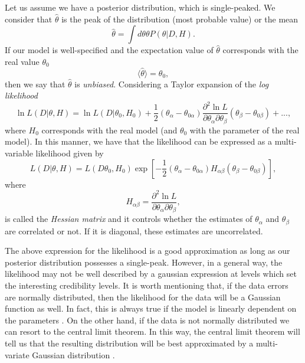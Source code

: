 \documentclass[onecolumn,           %
               showpacs,            %
               preprintnumbers,     %
               aps,                 %
               letterpaper,             %
               superscriptaddress,      %
               nofootinbib,         %
               tightenlines,        %
               floats,floatfix      %
               ,usenatbib,
               ]{revtex4-1}
\begin{document}
Let us assume we have a posterior distribution, which is single-peaked. We consider that $\hat \theta$ is the peak of the distribution (most probable value) or the mean
\begin{equation}
\hat \theta =\int d\theta \theta P(\theta|D, H).
\end{equation}
If our model is well-specified and the expectation value of $\hat \theta$ corresponds with the real value $\theta_0$
\begin{equation}
\langle\hat \theta\rangle=\theta_0,
\end{equation}
then we say that $\hat \theta$ is \textit{unbiased}. Considering a Taylor expansion of the \textit{log likelihood}
\begin{equation}
\ln L(D|\theta, H)=\ln L(D|\theta_0, H_0)+\frac{1}{2}(\theta_\alpha-\theta_{0\alpha})\frac{\partial^2\ln L}{\partial\theta_\alpha \partial\theta_\beta}(\theta_\beta-\theta_{0\beta})+...,
\end{equation}
where $H_0$ corresponds with the real model (and $\theta_0$ with the parameter of the real model). In this manner, we have that the likelihood can be expressed as a multi-variable likelihood given by 
\begin{equation}\label{GLik}
L(D|\theta, H)=L(D\theta_0, H_0)\exp \left[-\frac{1}{2}(\theta_\alpha-\theta_{0\alpha})H_{\alpha\beta}(\theta_\beta-\theta_{0\beta})\right],
\end{equation}
where 
\begin{equation}
H_{\alpha\beta}=\frac{\partial^2\ln L}{\partial\theta_\alpha \partial\theta_\beta},
\end{equation}
is called the \textit{Hessian matrix} and it controls whether the estimates of $\theta_\alpha$ and $\theta_\beta$ are correlated or not. If it is diagonal, these estimates are uncorrelated.

The above expression for the likelihood is a good approximation as long as our posterior distribution possesses a single-peak. However, in a general way, the likelihood may not be well described by a gaussian expression at levels which set the interesting credibility levels. It is worth mentioning that, if the data errors are normally distributed, then the likelihood for the data will be a Gaussian function as well.  In fact, this is always true if the model is linearly dependent on the parameters \cite{LiV}. On the other hand, if the data is not normally distributed we can resort to the central limit theorem. In this way, the central limit theorem will tell us that the resulting distribution will be best approximated by a multi-variate Gaussian distribution \cite{LiV}.
\end{document}
